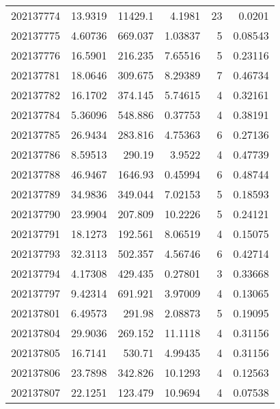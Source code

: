 \begin{tabular}{rrrrrr}
 202137774 &         13.9319  &    11429.1    &            4.1981  &          23 & 0.0201  \\
 202137775 &          4.60736 &      669.037  &            1.03837 &           5 & 0.08543 \\
 202137776 &         16.5901  &      216.235  &            7.65516 &           5 & 0.23116 \\
 202137781 &         18.0646  &      309.675  &            8.29389 &           7 & 0.46734 \\
 202137782 &         16.1702  &      374.145  &            5.74615 &           4 & 0.32161 \\
 202137784 &          5.36096 &      548.886  &            0.37753 &           4 & 0.38191 \\
 202137785 &         26.9434  &      283.816  &            4.75363 &           6 & 0.27136 \\
 202137786 &          8.59513 &      290.19   &            3.9522  &           4 & 0.47739 \\
 202137788 &         46.9467  &     1646.93   &            0.45994 &           6 & 0.48744 \\
 202137789 &         34.9836  &      349.044  &            7.02153 &           5 & 0.18593 \\
 202137790 &         23.9904  &      207.809  &           10.2226  &           5 & 0.24121 \\
 202137791 &         18.1273  &      192.561  &            8.06519 &           4 & 0.15075 \\
 202137793 &         32.3113  &      502.357  &            4.56746 &           6 & 0.42714 \\
 202137794 &          4.17308 &      429.435  &            0.27801 &           3 & 0.33668 \\
 202137797 &          9.42314 &      691.921  &            3.97009 &           4 & 0.13065 \\
 202137801 &          6.49573 &      291.98   &            2.08873 &           5 & 0.19095 \\
 202137804 &         29.9036  &      269.152  &           11.1118  &           4 & 0.31156 \\
 202137805 &         16.7141  &      530.71   &            4.99435 &           4 & 0.31156 \\
 202137806 &         23.7898  &      342.826  &           10.1293  &           4 & 0.12563 \\
 202137807 &         22.1251  &      123.479  &           10.9694  &           4 & 0.07538 \\

\end{tabular}
